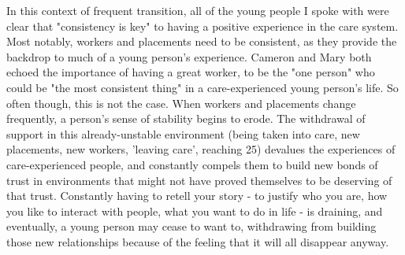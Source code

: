 In this context of frequent transition, all of the young people I spoke with were clear that "consistency is key" to having a positive experience in the care system. Most notably, workers and placements need to be consistent, as they provide the backdrop to much of a young person’s experience. Cameron and Mary both echoed the importance of having a great worker, to be the "one person" who could be "the most consistent thing" in a care-experienced young person's life. So often though, this is not the case. When workers and placements change frequently, a person’s sense of stability begins to erode. The withdrawal of support in this already-unstable environment (being taken into care, new placements, new workers, 'leaving care', reaching 25) devalues the experiences of care-experienced people, and constantly compels them to build new bonds of trust in environments that might not have proved themselves to be deserving of that trust. Constantly having to retell your story - to justify who you are, how you like to interact with people, what you want to do in life - is draining, and eventually, a young person may cease to want to, withdrawing from building those new relationships because of the feeling that it will all disappear anyway.

